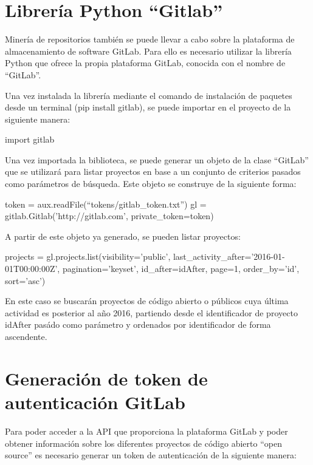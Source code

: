 \section{Librería Python ``Gitlab''}

Minería de repositorios también se puede llevar a cabo sobre la plataforma de almacenamiento de software GitLab. Para ello es necesario utilizar la librería Python que ofrece la propia plataforma GitLab, conocida con el nombre de ``GitLab''.

Una vez instalada la librería mediante el comando de instalación de paquetes desde un terminal (pip install gitlab), se puede importar en el proyecto de la siguiente manera:

import gitlab

Una vez importada la biblioteca, se puede generar un objeto de la clase ``GitLab'' que se utilizará para listar proyectos en base a un conjunto de criterios pasados como parámetros de búsqueda. Este objeto se construye de la siguiente forma:

token = aux.readFile(``tokens/gitlab\_token.txt'')
gl = gitlab.Gitlab('http://gitlab.com', private\_token=token)

A partir de este objeto ya generado, se pueden listar proyectos:

projects = gl.projects.list(visibility='public', 
                                        last\_activity\_after='2016-01-01T00:00:00Z', 
                                        pagination='keyset', 
                                        id\_after=idAfter, 
                                        page=1, 
                                        order\_by='id', 
                                        sort='asc')

En este caso se buscarán proyectos de código abierto o públicos cuya última actividad es posterior al año 2016, partiendo desde el identificador de proyecto idAfter pasádo como parámetro y ordenados por identificador de forma ascendente.

\section{Generación de token de autenticación GitLab}

Para poder acceder a la API que proporciona la plataforma GitLab y poder obtener información sobre los diferentes proyectos de código abierto ``open source'' es necesario generar un token de autenticación de la siguiente manera:

